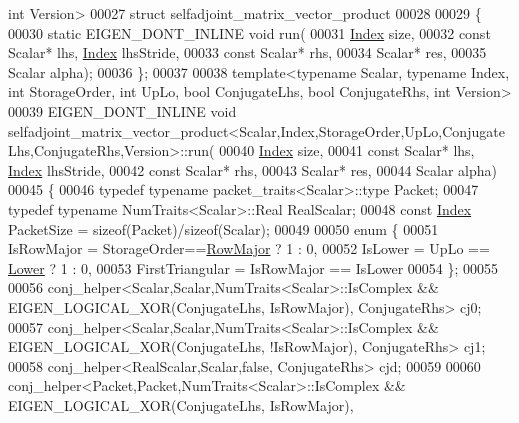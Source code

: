 \begin{DoxyCode}
       \textcolor{keywordtype}{int} Version>
00027 \textcolor{keyword}{struct }selfadjoint\_matrix\_vector\_product
00028 
00029 \{
00030 \textcolor{keyword}{static} EIGEN\_DONT\_INLINE \textcolor{keywordtype}{void} run(
00031   \hyperlink{namespace_eigen_a62e77e0933482dafde8fe197d9a2cfde}{Index} size,
00032   \textcolor{keyword}{const} Scalar*  lhs, \hyperlink{namespace_eigen_a62e77e0933482dafde8fe197d9a2cfde}{Index} lhsStride,
00033   \textcolor{keyword}{const} Scalar*  rhs,
00034   Scalar* res,
00035   Scalar alpha);
00036 \};
00037 
00038 \textcolor{keyword}{template}<\textcolor{keyword}{typename} Scalar, \textcolor{keyword}{typename} Index, \textcolor{keywordtype}{int} StorageOrder, \textcolor{keywordtype}{int} UpLo, \textcolor{keywordtype}{bool} ConjugateLhs, \textcolor{keywordtype}{bool} ConjugateRhs,
       \textcolor{keywordtype}{int} Version>
00039 EIGEN\_DONT\_INLINE \textcolor{keywordtype}{void} 
      selfadjoint\_matrix\_vector\_product<Scalar,Index,StorageOrder,UpLo,ConjugateLhs,ConjugateRhs,Version>::run(
00040   \hyperlink{namespace_eigen_a62e77e0933482dafde8fe197d9a2cfde}{Index} size,
00041   \textcolor{keyword}{const} Scalar*  lhs, \hyperlink{namespace_eigen_a62e77e0933482dafde8fe197d9a2cfde}{Index} lhsStride,
00042   \textcolor{keyword}{const} Scalar*  rhs,
00043   Scalar* res,
00044   Scalar alpha)
00045 \{
00046   \textcolor{keyword}{typedef} \textcolor{keyword}{typename} packet\_traits<Scalar>::type Packet;
00047   \textcolor{keyword}{typedef} \textcolor{keyword}{typename} NumTraits<Scalar>::Real RealScalar;
00048   \textcolor{keyword}{const} \hyperlink{namespace_eigen_a62e77e0933482dafde8fe197d9a2cfde}{Index} PacketSize = \textcolor{keyword}{sizeof}(Packet)/\textcolor{keyword}{sizeof}(Scalar);
00049 
00050   \textcolor{keyword}{enum} \{
00051     IsRowMajor = StorageOrder==\hyperlink{group__enums_ggaacded1a18ae58b0f554751f6cdf9eb13acfcde9cd8677c5f7caf6bd603666aae3}{RowMajor} ? 1 : 0,
00052     IsLower = UpLo == \hyperlink{group__enums_gga39e3366ff5554d731e7dc8bb642f83cda891792b8ed394f7607ab16dd716f60e6}{Lower} ? 1 : 0,
00053     FirstTriangular = IsRowMajor == IsLower
00054   \};
00055 
00056   conj\_helper<Scalar,Scalar,NumTraits<Scalar>::IsComplex && EIGEN\_LOGICAL\_XOR(ConjugateLhs,  IsRowMajor), 
      ConjugateRhs> cj0;
00057   conj\_helper<Scalar,Scalar,NumTraits<Scalar>::IsComplex && EIGEN\_LOGICAL\_XOR(ConjugateLhs, !IsRowMajor), 
      ConjugateRhs> cj1;
00058   conj\_helper<RealScalar,Scalar,false, ConjugateRhs> cjd;
00059 
00060   conj\_helper<Packet,Packet,NumTraits<Scalar>::IsComplex && EIGEN\_LOGICAL\_XOR(ConjugateLhs,  IsRowMajor), 

\end{DoxyCode}
